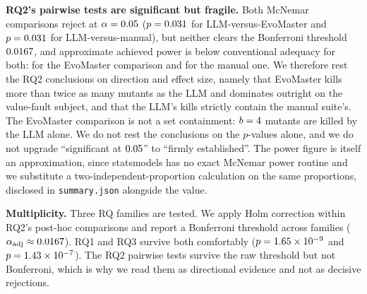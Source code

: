 \textbf{RQ2's pairwise tests are significant but fragile.} Both McNemar comparisons reject at
$\alpha=0.05$ ($p=0.031$ for LLM-versus-EvoMaster and $p=0.031$ for
LLM-versus-manual), but neither clears the Bonferroni threshold $0.0167$, and approximate
achieved power is below conventional adequacy for both: \RQIImcnemarLEpower{} for the
EvoMaster comparison and \RQIImcnemarLMpower{} for the manual one. We therefore rest the RQ2 conclusions on direction and effect size, namely that
EvoMaster kills more than twice as many mutants as the LLM and dominates outright on the
value-fault subject, and that the LLM's kills strictly contain the manual suite's. The
EvoMaster comparison is not a set containment: $b=4$ mutants are killed by the
LLM alone. We do not rest the conclusions on the $p$-values alone, and we do not upgrade
``significant at $0.05$'' to ``firmly established''. The power figure is itself an approximation, since
statsmodels has no exact McNemar power routine and we substitute a two-independent-proportion
calculation on the same proportions, disclosed in \texttt{summary.json} alongside the value.

\textbf{Multiplicity.} Three RQ families are tested. We apply Holm correction within RQ2's
post-hoc comparisons and report a Bonferroni threshold across families
($\alpha_{\text{adj}}\approx0.0167$). RQ1 and RQ3 survive both comfortably
($p=1.65\times10^{-9}$ and $p=1.43\times10^{-7}$). The RQ2 pairwise tests survive the raw threshold but not
Bonferroni, which is why we read them as directional evidence and not as decisive
rejections.
